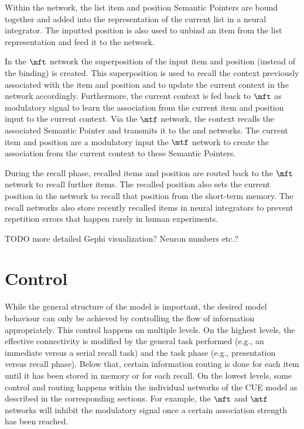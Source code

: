 Within the  network, the list item and position Semantic Pointers are bound together and added into the representation of the current list in a neural integrator.
The inputted position is also used to unbind an item from the list representation and feed it to the  network.

In the $\mft$ network the superposition of the input item and position (instead of the binding) is created.
This superposition is used to recall the context previously associated with the item and position and to update the current context in the  network accordingly.
Furthermore, the current context is fed back to $\mft$ as modulatory signal to learn the association from the current item and position input to the current context.
Via the $\mtf$ network, the context recalls the associated Semantic Pointer and transmits it to the  and  networks.
The current item and position are a modulatory input the $\mtf$ network to create the association from the current context to these Semantic Pointers.

During the recall phase, recalled items and position are routed back to the $\mft$ network to recall further items.
The recalled position also sets the current position in the  network to recall that position from the  short-term memory.
The recall networks also store recently recalled items in neural integrators to prevent repetition errors that happen rarely in human experiments.


TODO more detailed Gephi visualization? Neuron numbers etc.?


\section{Control}\label{sec:control}
While the general structure of the model is important, the desired model behaviour can only be achieved by controlling the flow of information appropriately.
This control happens on multiple levels.
On the highest levels, the effective connectivity is modified by the general task performed (e.g., an immediate versus a serial recall task) and the task phase (e.g., presentation versus recall phase).
Below that, certain information routing is done for each item until it has been stored in memory or for each recall.
On the lowest levels, some control and routing happens within the individual networks of the CUE model as described in the corresponding sections.
For example, the $\mft$ and $\mtf$ networks will inhibit the modulatory signal once a certain association strength has been reached.

